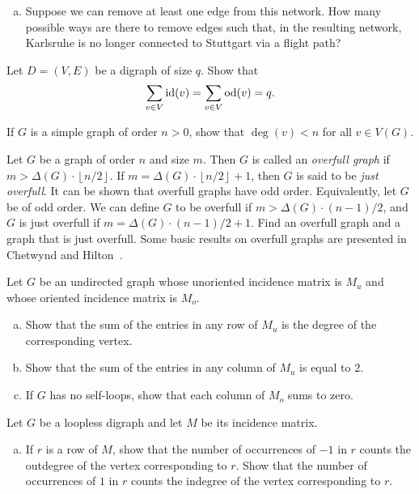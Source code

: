 \begin{problem}
\begin{enumerate}[(a)]
  \item Suppose we can remove at least one edge from this network. How
    many possible ways are there to remove edges such that, in the
    resulting network, Karlsruhe is no longer connected to Stuttgart
    via a flight path?
  \end{enumerate}

\item Let $D = (V, E)$ be a digraph of size $q$. Show that
  \[
  \sum_{v \in V} \operatorname*{id}(v)
  =
  \sum_{v \in V} \operatorname*{od}(v)
  =
  q.
  \]

\item If $G$ is a simple graph of order $n > 0$, show that
  $\deg(v) < n$ for all $v \in V(G)$.

\item Let $G$ be a graph of order $n$ and size $m$. Then $G$ is called
  an \emph{overfull graph} if
  $m > \Delta(G) \cdot \left\lfloor n / 2 \right\rfloor$. If
  $m = \Delta(G) \cdot \left\lfloor n / 2 \right\rfloor + 1$, then $G$
  is said to be \emph{just overfull}. It can be shown that overfull
  graphs have odd order. Equivalently, let $G$ be of odd order. We can
  define $G$ to be overfull if $m > \Delta(G) \cdot (n-1)/2$,
  and $G$ is just overfull if $m = \Delta(G) \cdot (n-1)/2 + 1$. Find
  an overfull graph and a graph that is just overfull. Some basic
  results on overfull graphs are presented in Chetwynd and
  Hilton~\cite{ChetwyndHilton1986}.

\item Let $G$ be an undirected graph whose unoriented incidence matrix
  is $M_u$ and whose oriented incidence matrix is $M_o$.
  \begin{enumerate}[(a)]
  \item Show that the sum of the entries in any row of $M_u$ is the
    degree of the corresponding vertex.

  \item Show that the sum of the entries in any column of $M_u$ is
    equal to $2$.

  \item If $G$ has no self-loops, show that each column of $M_o$ sums
    to zero.
  \end{enumerate}

\item Let $G$ be a loopless digraph and let $M$ be its incidence
  matrix.
  \begin{enumerate}[(a)]
  \item If $r$ is a row of $M$, show that the number of occurrences of
    $-1$ in $r$ counts the outdegree of the vertex corresponding to
    $r$. Show that the number of occurrences of $1$ in $r$ counts the
    indegree of the vertex corresponding to $r$.


\end{enumerate}
\end{problem}
